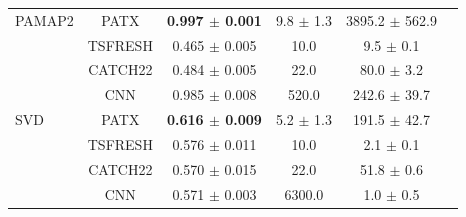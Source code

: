 \begin{table}[H]
\begin{tabular*}{\textwidth}{@{\extracolsep{\fill}}lccccc@{}}
\addlinespace
PAMAP2 & PATX & \textbf{0.997 $\pm$ 0.001} & 9.8 $\pm$ 1.3 & 3895.2 $\pm$ 562.9 \\
 & TSFRESH & 0.465 $\pm$ 0.005 & 10.0 & 9.5 $\pm$ 0.1 \\
 & CATCH22 & 0.484 $\pm$ 0.005 & 22.0 & 80.0 $\pm$ 3.2 \\
 & CNN & 0.985 $\pm$ 0.008 & 520.0 & 242.6 $\pm$ 39.7 \\
\addlinespace
SVD & PATX & \textbf{0.616 $\pm$ 0.009} & 5.2 $\pm$ 1.3 & 191.5 $\pm$ 42.7 \\
 & TSFRESH & 0.576 $\pm$ 0.011 & 10.0 & 2.1 $\pm$ 0.1 \\
 & CATCH22 & 0.570 $\pm$ 0.015 & 22.0 & 51.8 $\pm$ 0.6 \\
 & CNN & 0.571 $\pm$ 0.003 & 6300.0 & 1.0 $\pm$ 0.5 \\
\bottomrule
\end{tabular*}
\end{table}
